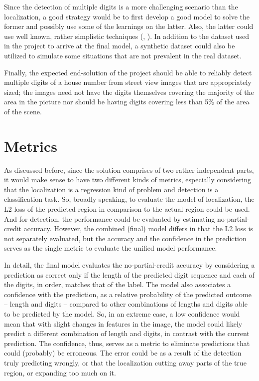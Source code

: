 \documentclass{article}
\begin{document}
	Since the detection of multiple digits is a more challenging scenario than the localization, a good strategy would be to first develop a good model to solve the former and possibly use some of the learnings on the latter. Also, the latter could use well known, rather simplistic techniques (\cite{Vaillant94anoriginal}, \cite{SermanetEZMFL13}). In addition to the dataset used in the project to arrive at the final model, a synthetic dataset could also be utilized to simulate some situations that are not prevalent in the real dataset.
	
	Finally, the expected end-solution of the project should be able to reliably detect multiple digits of a house number from street view images that are appropriately sized; the images need not have the digits themselves covering the majority of the area in the picture nor should be having digits covering less than 5\% of the area of the scene.
	
	\section{Metrics}
	As discussed before, since the solution comprises of two rather independent parts, it would make sense to have two different kinds of metrics, especially considering that the localization is a regression kind of problem and detection is a classification task. So, broadly speaking, to evaluate the model of localization, the L2 loss of the predicted region in comparison to the actual region could be used. And for detection, the performance could be evaluated by estimating no-partial-credit accuracy. However, the combined (final) model differs in that the L2 loss is not separately evaluated, but the accuracy and the confidence in the prediction serves as the single metric to evaluate the unified model performance.
	
	In detail, the final model evaluates the no-partial-credit accuracy by considering a prediction as correct only if the length of the predicted digit sequence and each of the digits, in order, matches that of the label. The model also associates a confidence with the prediction, as a relative probability of the predicted outcome -- length and digits -- compared to other combinations of lengths and digits able to be predicted by the model. So, in an extreme case, a low confidence would mean that with slight changes in features in the image, the model could likely predict a different combination of length and digits, in contrast with the current prediction. The confidence, thus, serves as a metric to eliminate predictions that could (probably) be erroneous. The error could be as a result of the detection truly predicting wrongly, or that the localization cutting away parts of the true region, or expanding too much on it.
	
\end{document}
